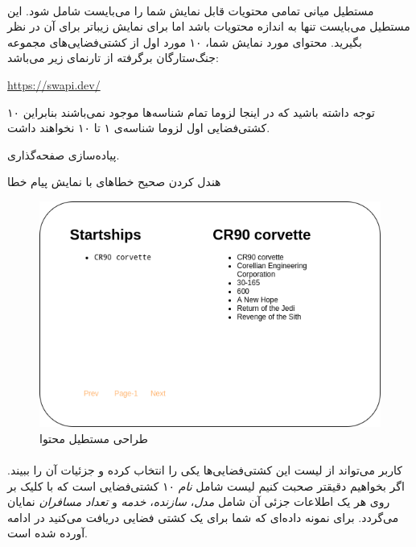 \documentclass[../main.tex]{subfiles}
\begin{document}
\paragraph{}
مستطیل میانی تمامی محتویات قابل نمایش شما را می‌بایست شامل شود. این مستطیل می‌بایست تنها به اندازه محتویات باشد اما برای نمایش زیباتر برای آن  در نظر بگیرید.
محتوای مورد نمایش شما، ۱۰ مورد اول از کشتی‌فضایی‌های مجموعه جنگ‌ستارگان برگرفته از تارنمای زیر می‌باشد:

\begin{latin}
  \url{https://swapi.dev/}
\end{latin}

توجه داشته باشید که در اینجا لزوما تمام شناسه‌ها موجود نمی‌باشند بنابراین ۱۰ کشتی‌فضایی اول لزوما شناسه‌ی ۱ تا ۱۰ نخواهند داشت.

\begin{extra}
پیاده‌سازی صفحه‌گذاری.
\end{extra}

\begin{extra}
هندل کردن صحیح خطاهای  با نمایش پیام خطا
\end{extra}

\begin{figure}[h]
  \centering
  \includegraphics[scale=0.25]{./swapi-content}
  \caption{طراحی مستطیل محتوا}
\end{figure}

\paragraph{}
کاربر می‌تواند از لیست این کشتی‌فضایی‌ها یکی را انتخاب کرده و جزئیات آن را ببیند. اگر بخواهیم دقیقتر صحبت کنیم لیست شامل \textit{نام} ۱۰ کشتی‌فضایی است که با کلیک بر روی هر یک اطلاعات جزئی آن شامل \textit{مدل}، \textit{سازنده}، \textit{خدمه} و \textit{تعداد مسافران} نمایان می‌گردد.
برای نمونه داده‌ای که شما برای یک کشتی فضایی دریافت می‌کنید در ادامه آورده شده است.
\end{document}

